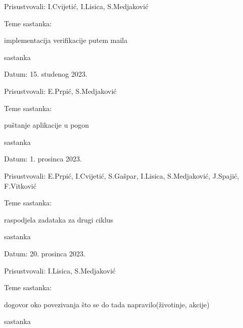 \begin{packed_enum}
\begin{packed_item}
				\item Prisustvovali: I.Cvijetić, I.Lisica, S.Medjaković
				\item Teme sastanka:
				\begin{packed_item}
					\item implementacija verifikacije putem maila
				\end{packed_item}
			\end{packed_item}
			\item  sastanka
			\item[] \begin{packed_item}
				\item Datum: 15. studenog 2023.
				\item Prisustvovali: E.Prpić, S.Medjaković
				\item Teme sastanka:
				\begin{packed_item}
					\item  puštanje aplikacije u pogon
				\end{packed_item}
			\end{packed_item}
			\item  sastanka
			\item[] \begin{packed_item}
				\item Datum: 1. prosinca 2023.
				\item Prisustvovali: E.Prpić, I.Cvijetić, S.Gašpar, I.Lisica, S.Medjaković, J.Spajić, F.Vitković
				\item Teme sastanka:
				\begin{packed_item}
					\item  raspodjela zadataka za drugi ciklus
				\end{packed_item}
			\end{packed_item}
			\item  sastanka
			\item[] \begin{packed_item}
				\item Datum: 20. prosinca 2023.
				\item Prisustvovali: I.Lisica, S.Medjaković
				\item Teme sastanka:
				\begin{packed_item}
					\item  dogovor oko povezivanja što se do tada napravilo(životinje, akcije)
				\end{packed_item}
			\end{packed_item}
			\item  sastanka
			\item[] \begin{packed_item}

\end{packed_item}
\end{packed_enum}
